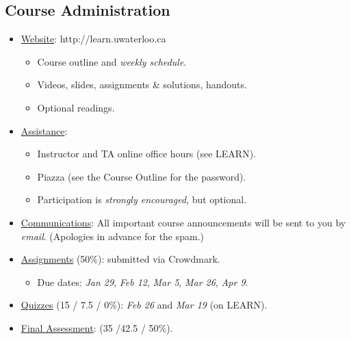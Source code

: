 \subsection*{Course Administration}
\begin{itemize}
    \item \underline{Website}: http://learn.uwaterloo.ca
          \begin{itemize}
              \item Course outline and \emph{weekly schedule}.
              \item Videos, slides, assignments \& solutions, handouts.
              \item Optional readings.
          \end{itemize}
    \item \underline{Assistance}:
          \begin{itemize}
              \item Instructor and TA online office hours (see LEARN).
              \item Piazza (see the Course Outline for the password).
              \item Participation is \emph{strongly encouraged}, but optional.
          \end{itemize}
    \item \underline{Communications}: All important course announcements will
          be sent to you by \emph{email}. (Apologies in advance for the spam.)
    \item \underline{Assignments} (50\%): submitted via Crowdmark.
          \begin{itemize}
              \item Due dates: \emph{Jan 29}, \emph{Feb 12}, \emph{Mar 5}, \emph{Mar 26}, \emph{Apr 9}.
          \end{itemize}
    \item \underline{Quizzes} (15 / 7.5 / 0\%): \emph{Feb 26} and \emph{Mar 19} (on LEARN).
    \item \underline{Final Assessment}\@: (35 /42.5 / 50\%).
\end{itemize}
